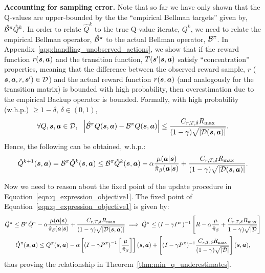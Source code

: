 \textbf{Accounting for sampling error.} Note that so far we have only shown that the Q-values are upper-bounded by the the ``empirical Bellman targets'' given by, $\hat{\mathcal{B}}^\pi \hat{Q}^k$. In order to relate $\hat{Q}^k$ to the true Q-value iterate, $Q^k$, we need to relate the empirical Bellman operator, $\hat{\mathcal{B}}^\pi$ to the actual Bellman operator, $\mathcal{B}^\pi$. In Appendix~\ref{app:handling_unobserved_actions}, we show that if the reward function $r(\boldsymbol{s}, \boldsymbol{a})$ and the transition function, $T(\boldsymbol{s}'|\boldsymbol{s}, \boldsymbol{a})$ satisfy ``concentration'' properties, meaning that the difference between the observed reward sample, $r$ ($\boldsymbol{s}, \boldsymbol{a}, r, \boldsymbol{s}') \in \mathcal{D}$) and the actual reward function $r(\boldsymbol{s}, \boldsymbol{a})$ (and analogously for the transition matrix) is bounded with high probability, then overestimation due to the empirical Backup operator is bounded. Formally, with high probability (w.h.p.) $\geq 1 - \delta$, $\delta \in (0, 1)$, 
\begin{equation*}
    \forall Q, \boldsymbol{s}, \boldsymbol{a} \in \mathcal{D},~~ \left\vert \hat{\mathcal{B}}^\pi Q(\boldsymbol{s}, \boldsymbol{a}) - \mathcal{B}^\pi Q(\boldsymbol{s}, \boldsymbol{a}) \right\vert \leq \frac{C_{r, T, \delta} R_{\max}}{(1 - \gamma) \sqrt{|\mathcal{D}(\boldsymbol{s}, \boldsymbol{a})|}}.
\end{equation*}
Hence, the following can be obtained, w.h.p.:
\begin{align}
\label{eqn:pac_bound_q_value}
    \hat{Q}^{k+1}(\boldsymbol{s}, \boldsymbol{a}) = \mathcal{B}^\pi \hat{Q}^k(\boldsymbol{s}, \boldsymbol{a}) \leq \mathcal{B}^\pi \hat{Q}^k(\boldsymbol{s}, \boldsymbol{a}) - \alpha \frac{\mu(\boldsymbol{a}|\boldsymbol{s})}{\hat{\pi}_\beta(\boldsymbol{a}|\boldsymbol{s})} + \frac{C_{r, T, \delta} R_{\max}}{(1 - \gamma) \sqrt{|\mathcal{D}(\boldsymbol{s}, \boldsymbol{a})|}}.
\end{align}

Now we need to reason about the fixed point of the update procedure in Equation~\ref{eqn:q_expression_objective1}. The fixed point of Equation~\ref{eqn:q_expression_objective1} is given by:
\begin{multline*}
    \hat{Q}^\pi \leq \mathcal{B}^\pi \hat{Q}^\pi - \alpha \frac{\mu(\boldsymbol{a}|\boldsymbol{s})}{\hat{\pi}_\beta(\boldsymbol{a}|\boldsymbol{s})} + \frac{C_{r, T, \delta} R_{\max}}{(1 - \gamma) \sqrt{|\mathcal{D}(\boldsymbol{s}, \boldsymbol{a})|}} \implies \hat{Q}^\pi \leq (I - \gamma P^\pi)^{-1} \left[ R  - \alpha \frac{\mu}{\hat{\pi}_\beta} + \frac{C_{r, T, \delta} R_{\max}}{1 - \gamma) \sqrt{|\mathcal{D}}}\right]\\
    \hat{Q}^\pi(\boldsymbol{s}, \boldsymbol{a}) \leq Q^\pi(\boldsymbol{s}, \boldsymbol{a}) - \alpha \left[ \left(I - \gamma P^\pi \right)^{-1} \left[\frac{\mu}{\hat{\pi}_\beta} \right] \right](\boldsymbol{s}, \boldsymbol{a}) + \left[(I - \gamma P^\pi)^{-1} \frac{C_{r, T, \delta} R_{\max}}{(1 - \gamma) \sqrt{|\mathcal{D}|}} \right](\boldsymbol{s}, \boldsymbol{a}),
\end{multline*}
thus proving the relationship in Theorem~\ref{thm:min_q_underestimates}.

